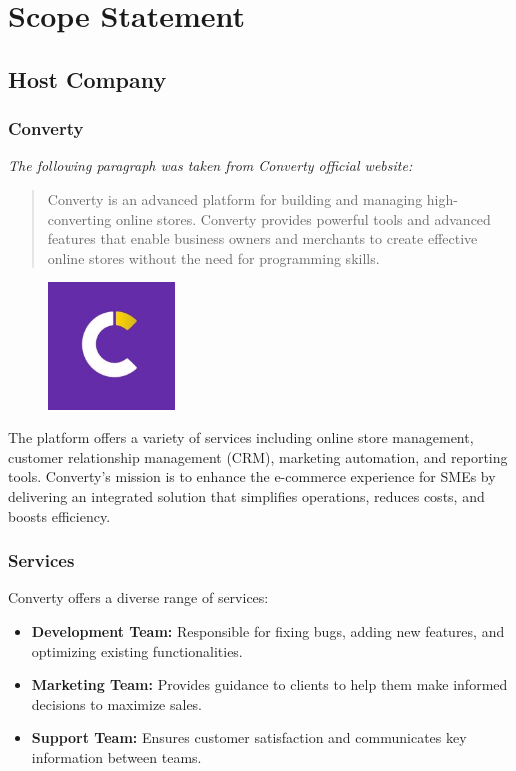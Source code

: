 \chapter{Scope Statement}

\section{Host Company}
\subsection{Converty}
\textit{The following paragraph was taken from Converty official website:}
\begin{quote}
Converty is an advanced platform for building and managing high-converting online stores. Converty provides powerful tools and advanced features that enable business owners and merchants to create effective online stores without the need for programming skills.
\end{quote}

\begin{figure}[h]
  \centering
  \includegraphics[width=0.3\textwidth]{Images/convertyLogo.jpeg}
  \label{fig:Converty Logo}
\end{figure}

The platform offers a variety of services including online store management, customer relationship management (CRM), marketing automation, and reporting tools. Converty's mission is to enhance the e-commerce experience for SMEs by delivering an integrated solution that simplifies operations, reduces costs, and boosts efficiency.
\newline

\subsection{Services}
Converty offers a diverse range of services:
\begin{itemize}
    \item \textbf{Development Team:} Responsible for fixing bugs, adding new features, and optimizing existing functionalities.
    \item \textbf{Marketing Team:} Provides guidance to clients to help them make informed decisions to maximize sales.
    \item \textbf{Support Team:} Ensures customer satisfaction and communicates key information between teams.
\end{itemize}

